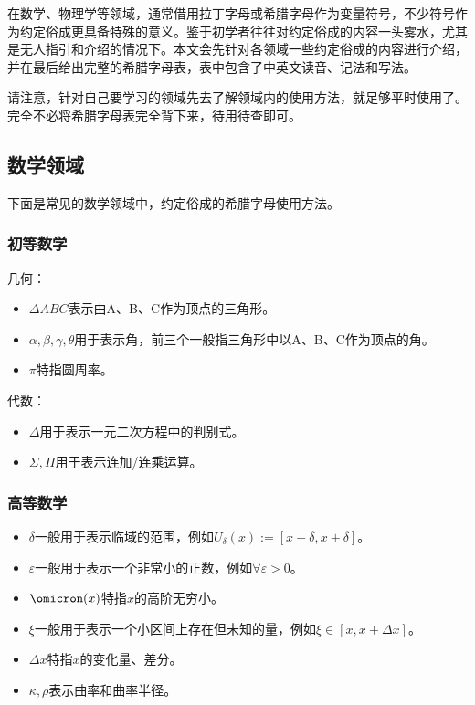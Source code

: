 
\begin{issues}
\issueDraft
\end{issues}

在数学、物理学等领域，通常借用拉丁字母或希腊字母作为变量符号，不少符号作为约定俗成更具备特殊的意义。鉴于初学者往往对约定俗成的内容一头雾水，尤其是无人指引和介绍的情况下。本文会先针对各领域一些约定俗成的内容进行介绍，并在最后给出完整的希腊字母表，表中包含了中英文读音、记法和写法。

请注意，针对自己要学习的领域先去了解领域内的使用方法，就足够平时使用了。完全不必将希腊字母表完全背下来，待用待查即可。

\subsection{数学领域}

下面是常见的数学领域中，约定俗成的希腊字母使用方法。

\subsubsection{初等数学}

几何：

\begin{itemize}
\item $\Delta ABC$表示由A、B、C作为顶点的三角形。
\item $\alpha,\beta,\gamma,\theta$用于表示角，前三个一般指三角形中以A、B、C作为顶点的角。
\item $\pi$特指圆周率。
\end{itemize}

代数：

\begin{itemize}
\item $\Delta$用于表示一元二次方程中的判别式。
\item $\Sigma,\Pi$用于表示连加/连乘运算。
\end{itemize}

\subsubsection{高等数学}

\begin{itemize}
\item $\delta$一般用于表示临域的范围，例如$U_\delta(x):=[x-\delta,x+\delta]$。
\item $\varepsilon$一般用于表示一个非常小的正数，例如$\forall\varepsilon>0$。
\item $\omicron (x)$特指$x$的高阶无穷小。
\item $\xi$一般用于表示一个小区间上存在但未知的量，例如$\xi\in[x,x+\Delta x]$。
\item $\Delta x$特指$x$的变化量、差分。
\item $\kappa,\rho$表示曲率和曲率半径。
\end{itemize}

